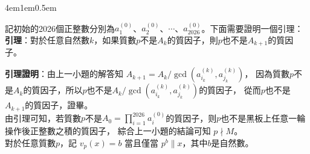 \documentclass[12pt]{article}
\begin{document}
\begin{mybox}[解答]{4em}{1em}{0.5em}
\begin{enumerate}[label=(\arabic*)]
        記初始的2026個正整數分別為$a_1^{\left(0\right)}$、$a_2^{\left(0\right)}$、$\cdots$、$a_{2026}^{\left(0\right)}$。下面需要證明一個引理：\\
        
        \textbf{引理}：對於任意自然數$k$，如果質數$p$不是$A_k$的質因子，則$p$也不是$A_{k+1}$的質因子。
        
        \textbf{引理證明}：由上一小題的解答知 $A_{k+1}=A_k/\gcd\left(a_{i_k}^{\left(k\right)},a_{j_k}^{\left(k\right)}\right)$，
        因為質數$p$不是$A_k$的質因子，所以$p$也不是$A_k/\gcd\left(a_{i_k}^{\left(k\right)},a_{j_k}^{\left(k\right)}\right)$的質因子，
        從而$p$也不是$A_{k+1}$的質因子，證畢。\\

        由引理可知，若質數$p$不是$A_0=\prod\limits_{i=1}^{2026}{a_i^{\left(0\right)}}$的質因子，则$p$也不是黑板上任意一輪操作後正整數之積的質因子，
        綜合上一小題的結論可知 $p\nmid M$。\\

        對於任意質數$p$，記 $v_p\left(x\right)=b$ 當且僅當 $p^b\|x$，其中$b$是自然數。


\end{enumerate}
\end{mybox}
\end{document}
